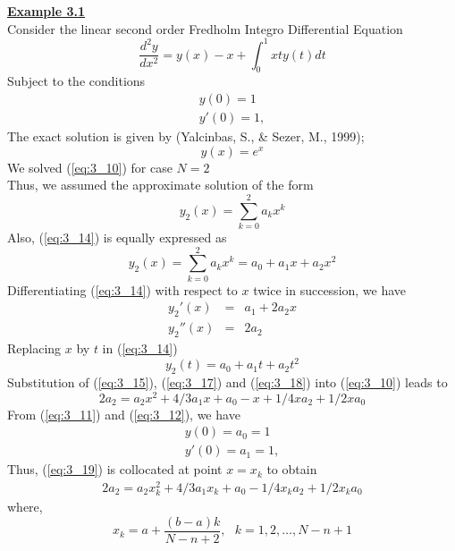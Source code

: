 \documentclass[12pt]{report}
\newcommand{\ubt}[1]{\textbf{\underline{#1}}}
\newcommand{\sps}{\\[0.2cm]}
\newcommand{\refn}[1]{(\ref{#1})}
\newcommand{\IDE}{Integro Differential Equation}
\newcommand{\sprime}{'}
\newcommand{\dprime}{''}
\newcommand{\NI}{\noindent}
\begin{document}
	\NI\ubt{Example 3.1}\sps
	Consider the linear second order Fredholm \IDE 
	\begin{equation}
		\frac{d^2y}{dx^2} = y(x) - x + \int_0^1 xty(t)dt \label{eq:3_10}
	\end{equation}
	Subject to the conditions
	\begin{eqnarray}
		y(0)=1 \sps \label{eq:3_11}
		y\sprime(0)=1, \label{eq:3_12}
	\end{eqnarray}
	The exact solution is given by (Yalcinbas, S., \& Sezer, M., 1999);
	\begin{equation}
		y(x) = e^x \label{eq:3_13}
	\end{equation}
	We solved \refn{eq:3_10} for case $N = 2$\\
	Thus, we assumed the approximate solution of the form 
	\begin{equation}
		y_2(x) = \sum_{k=0}^{2}a_kx^k \label{eq:3_14}
	\end{equation}
	Also, \refn{eq:3_14} is equally expressed as
	\begin{equation}
		y_2(x) = \sum_{k=0}^{2}a_kx^k = a_0 +a_1x+a_2x^2 \label{eq:3_15}
	\end{equation}
	Differentiating \refn{eq:3_14} with respect to $x$ twice in succession, we have
	\begin{eqnarray}
		y_2\sprime(x) &=& a_1 + 2a_2x \label{eq:3_16}\sps
		y_2\dprime(x) &=& 2a_2 \label{eq:3_17}
	\end{eqnarray}
	Replacing $x$ by $t$ in \refn{eq:3_14}
	\begin{equation}
		y_2(t) = a_0 + a_1t+a_2t^2 \label{eq:3_18}
	\end{equation}
	Substitution of \refn{eq:3_15}, \refn{eq:3_17} and \refn{eq:3_18} into \refn{eq:3_10} leads to 
	\begin{equation}
		2a_2 = a_2x^2 + 4/3a_1x+a_0-x+1/4xa_2+1/2xa_0 \label{eq:3_19}
	\end{equation}
	From \refn{eq:3_11} and \refn{eq:3_12}, we have
	\begin{eqnarray}
		y(0)= a_0 = 1 \label{eq:3_20}\sps 
		y\sprime(0)= a_1 = 1, \label{eq:3_21}
	\end{eqnarray}
	Thus, \refn{eq:3_19} is collocated at point $x=x_k$ to obtain
	\begin{eqnarray}
		2a_2 = a_2x_k^2 + 4/3a_1x_k + a_0 - 1/4x_ka_2+1/2x_ka_0 \label{eq:3_22}
	\end{eqnarray}
	where,
	\begin{equation}
		x_k = a+ \frac{(b-a)k}{N-n+2}, ~~~ k=1,2,\ldots,N-n+1 \label{eq:3_23}
	\end{equation}
\end{document}

